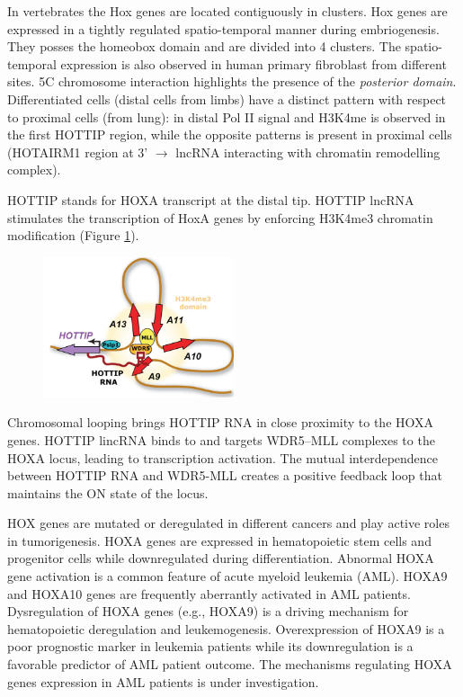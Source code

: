 In vertebrates the Hox genes are located contiguously in clusters. Hox genes are expressed in a tightly regulated spatio-temporal manner during embriogenesis. They posses the homeobox domain and are divided into 4 clusters. The spatio-temporal expression is also observed in human primary fibroblast from different sites. 5C chromosome interaction highlights the presence of the \emph{posterior domain}. Differentiated cells (distal cells from limbs) have a distinct pattern with respect to proximal cells (from lung): in distal Pol II signal and H3K4me is observed in the first HOTTIP region, while the opposite patterns is present in proximal cells (HOTAIRM1 region at 3' $\rightarrow$ lncRNA interacting with chromatin remodelling complex).

HOTTIP stands for HOXA transcript at the distal tip. HOTTIP lncRNA stimulates the transcription of HoxA genes by enforcing H3K4me3 chromatin modification (Figure \ref{fig:hottip}).

\begin{figure}
\centering
\includegraphics[width=0.5\textwidth]{../_resources/Screen_Shot_2022-11-25_at_11-49-03.png}
\caption{}
\label{fig:hottip}
\end{figure}

Chromosomal looping brings HOTTIP RNA in close proximity to the HOXA genes. HOTTIP lincRNA binds to and targets WDR5--MLL complexes to the HOXA locus, leading to transcription activation. The mutual interdependence between HOTTIP RNA and WDR5-MLL creates a positive feedback loop that maintains the ON state of the locus.

HOX genes are mutated or deregulated in different cancers and play active roles in tumorigenesis. HOXA genes are expressed in hematopoietic stem cells and progenitor cells while downregulated during differentiation. Abnormal HOXA gene activation is a common feature of acute myeloid leukemia (AML). HOXA9 and HOXA10 genes are frequently aberrantly activated in AML patients. Dysregulation of HOXA genes (e.g., HOXA9) is a driving mechanism for hematopoietic deregulation and leukemogenesis. Overexpression of HOXA9 is a poor prognostic marker in leukemia patients while its downregulation is a favorable predictor of AML patient outcome. The mechanisms regulating HOXA genes expression in AML patients is under investigation.

